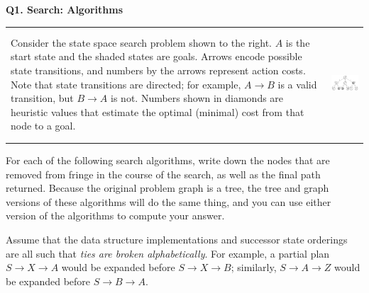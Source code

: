 \textbf{Q1. Search: Algorithms}

\begin{tabular}{l@{\hspace{0.15\linewidth}}c}
\begin{minipage}{0.45\linewidth}

Consider the state space search problem shown to the right.
$A$ is the start state and the shaded states are goals.
Arrows encode possible state transitions, and numbers by the arrows represent action costs.
Note that state transitions are directed; for example, $A \rightarrow B$ is a valid transition, but $B \rightarrow A$ is not.
Numbers shown in diamonds are heuristic values that estimate the optimal (minimal) cost from that node to a goal.

\end{minipage}

&

\begin{minipage}{0.34\linewidth}

  \includegraphics[height=1.6in]{figures/search_tree.pdf}

\end{minipage}

\end{tabular}


For each of the following search algorithms, write down the nodes that are removed from fringe in the course of the search, as well as the final path returned.
Because the original problem graph is a tree, the tree and graph versions of these algorithms will do the same thing, and you can use either version of the algorithms to compute your answer.

Assume that the data structure implementations and successor state orderings are all such that \emph{ties are broken alphabetically}.
For example, a partial plan $S \rightarrow X \rightarrow A$ would be expanded before $S \rightarrow X \rightarrow B$; similarly, $S \rightarrow A \rightarrow Z$ would be expanded before $S \rightarrow B \rightarrow A$.

\vfill

